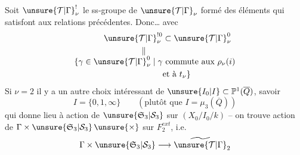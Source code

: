 Soit $\unsure{\mathcal T|\Gamma}_\nu^{!}$ le ss-groupe de $\unsure{\mathcal T|\Gamma}_\nu$
formé des éléments qui satisfont
aux relations précédentes. Donc\ldots
avec
\[
\begin{aligned}
\unsure{\mathcal T|\Gamma}_\nu^{!0}&\subset\unsure{\mathcal T|\Gamma}_\nu^{0}\\
\Vert\qquad&\\[-1ex]
\{\gamma\in\unsure{\mathcal T|\Gamma}_\nu^0\mid\gamma&\text{ commute aux }\rho_\nu(i)\\
&\text{et à }t_\nu\}
\end{aligned}
\]
Si $\nu=2$ il y a un autre choix
intéressant de $\unsure{I_0|I}\subset\mathbb P^1(\overline Q)$, savoir
\[
I=\{0,1,\infty\}\qquad(\text{plutôt que }I=\mu_3(\overline Q))
\]
qui donne lieu à action de
$\unsure{\mathfrak S_3|\mathcal S_3}$ sur $(X_0/I_0/k)$ -- on trouve
action de $\Gamma\times\unsure{\mathfrak S_3|\mathcal S_3}\,\unsure{\times}$ sur $F_2^{ext}$, i.e.
\[
\Gamma\times\unsure{\mathfrak S_3|\mathcal S_3}\longrightarrow\widetilde{\unsure{\mathcal T|\Gamma}}_2
\]

